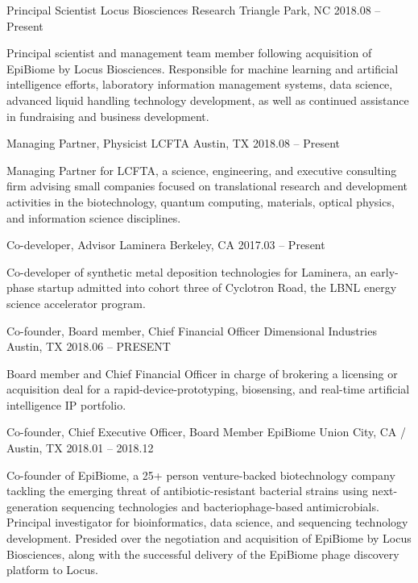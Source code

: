 \begin{cventries}
    \cventry
    {Principal Scientist}
    {Locus Biosciences}
    {Research Triangle Park, NC}
    {2018.08 -- Present}
    {
      \begin{cvitems}
        Principal scientist and management team member following acquisition of EpiBiome by Locus Biosciences. Responsible for machine learning and artificial intelligence efforts, laboratory information management systems, data science, advanced liquid handling technology development, as well as continued assistance in fundraising and business development.
      \end{cvitems}
    }
    \cventry
    {Managing Partner, Physicist}
    {LCFTA}
    {Austin, TX}
    {2018.08 -- Present}
    {
      \begin{cvitems}
        Managing Partner for LCFTA, a science, engineering, and executive consulting firm advising small companies focused on translational research and development activities in the biotechnology, quantum computing, materials, optical physics, and information science disciplines.
      \end{cvitems}
    }
    \cventry
    {Co-developer, Advisor}
    {Laminera}
    {Berkeley, CA}
    {2017.03 -- Present}
    {
      \begin{cvitems}
        Co-developer of synthetic metal deposition technologies for Laminera, an early-phase startup admitted into cohort three of Cyclotron Road, the LBNL energy science accelerator program.
      \end{cvitems}
    }
    \cventry
    {Co-founder, Board member, Chief Financial Officer}
    {Dimensional Industries}
    {Austin, TX}
    {2018.06 -- PRESENT}
    {
      \begin{cvitems}
        Board member and Chief Financial Officer in charge of brokering a licensing or acquisition deal for a rapid-device-prototyping, biosensing, and real-time artificial intelligence IP portfolio.
      \end{cvitems}
    }
    \cventry
    {Co-founder, Chief Executive Officer, Board Member}
    {EpiBiome}
    {Union City, CA / Austin, TX}
    {2018.01 -- 2018.12}
    {
      \begin{cvitems}
        Co-founder of EpiBiome, a 25+ person venture-backed biotechnology company tackling the emerging threat of antibiotic-resistant bacterial strains using next-generation sequencing technologies and bacteriophage-based antimicrobials. Principal investigator for bioinformatics, data science, and sequencing technology development. Presided over the negotiation and acquisition of EpiBiome by Locus Biosciences, along with the successful delivery of the EpiBiome phage discovery platform to Locus.

\end{cvitems}}
\end{cventries}
